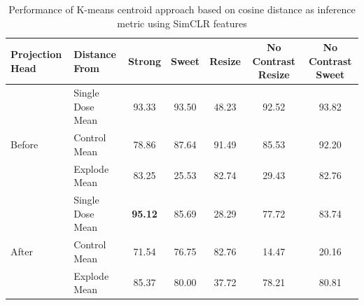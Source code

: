 \begin{table}[H]
  \centering
  \begin{tabular}{@{}llccccc@{}}
  \toprule
  Projection Head & Distance From      & Strong & Sweet & Resize & No Contrast Resize & No Contrast Sweet \\ \midrule
                  & Single Dose Mean   & 93.33      & 93.50     & 48.23      & 92.52                  & 93.82                 \\
  Before          & Control Mean       & 78.86      & 87.64     & 91.49      & 85.53                  & 92.20                 \\
                  & Explode Mean        & 83.25      & 25.53     & 82.74      & 29.43                  & 82.76                 \\ \midrule
                  & Single Dose Mean   & \textbf{95.12}      & 85.69     & 28.29      & 77.72                  & 83.74                 \\
  After           & Control Mean       & 71.54      & 76.75     & 82.76      & 14.47                  & 20.16                 \\
                  & Explode Mean        & 85.37      & 80.00     & 37.72      & 78.21                  & 80.81                 \\ \bottomrule
  \end{tabular}
  \caption{Performance of K-means centroid approach based on cosine distance as inference metric using SimCLR features}
  \label{tab:table_label}
\end{table}

